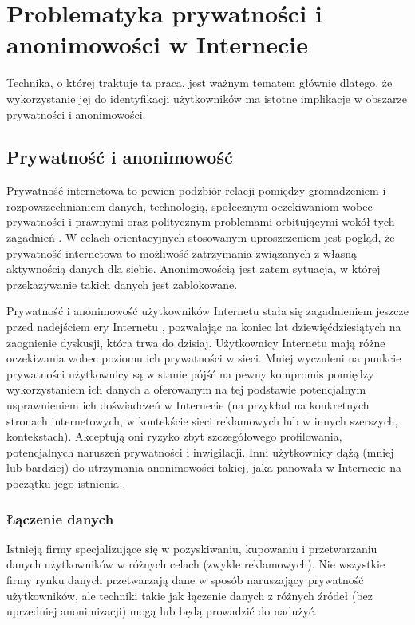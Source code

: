 \chapter{Problematyka prywatności i anonimowości w Internecie}
Technika, o której traktuje ta praca, jest ważnym tematem głównie dlatego, że
wykorzystanie jej do identyfikacji użytkowników ma istotne implikacje w obszarze
prywatności i anonimowości.

\section{Prywatność i anonimowość}
Prywatność internetowa to pewien podzbiór relacji pomiędzy gromadzeniem i
rozpowszechnianiem danych, technologią, społecznym oczekiwaniom wobec
prywatności i prawnymi oraz politycznym problemami orbitującymi wokół tych
zagadnień \cite{michael2013uberveillance}. W celach orientacyjnych stosowanym
uproszczeniem jest pogląd, że prywatność internetowa to możliwość zatrzymania
związanych z własną aktywnością danych dla siebie. Anonimowością jest zatem
sytuacja, w której przekazywanie takich danych jest zablokowane.

Prywatność i anonimowość użytkowników Internetu stała się zagadnieniem jeszcze
przed nadejściem ery Internetu \cite{david1965some}, pozwalając na koniec lat
dziewięćdziesiątych na zaognienie dyskusji, która trwa do dzisiaj. Użytkownicy
Internetu mają różne oczekiwania wobec poziomu ich prywatności w sieci. Mniej
wyczuleni na punkcie prywatności użytkownicy są w stanie pójść na pewny
kompromis pomiędzy wykorzystaniem ich danych a oferowanym na tej podstawie
potencjalnym usprawnieniem ich doświadczeń w Internecie (na przykład na
konkretnych stronach internetowych, w kontekście sieci reklamowych lub w innych
szerszych, kontekstach). Akceptują oni ryzyko zbyt szczegółowego profilowania,
potencjalnych naruszeń prywatności i inwigilacji. Inni użytkownicy dążą (mniej
lub bardziej) do utrzymania anonimowości takiej, jaka panowała w Internecie na
początku jego istnienia \cite[s. 54--69]{snowden2019pamiec}.

\subsection{Łączenie danych}
Istnieją firmy specjalizujące się w pozyskiwaniu, kupowaniu i przetwarzaniu
danych użytkowników w różnych celach (zwykle reklamowych). Nie wszystkie firmy
rynku danych przetwarzają dane w sposób naruszający prywatność użytkowników, ale
techniki takie jak łączenie danych z różnych źródeł (bez uprzedniej
anonimizacji) mogą lub będą prowadzić do nadużyć.

